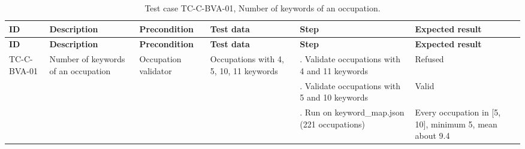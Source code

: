 {\footnotesize{}\renewcommand{\arraystretch}{1.1}
\begin{longtable}{|>{\raggedright\arraybackslash}p{}|>{\raggedright\arraybackslash}p{}|>{\raggedright\arraybackslash}p{}|>{\raggedright\arraybackslash}p{}|>{\raggedright\arraybackslash}p{}|>{\raggedright\arraybackslash}p{}|}
\caption{Test case TC-\allowbreak{}C-\allowbreak{}BVA-\allowbreak{}01, Number of keywords of an occupation.} \\
\hline
\textbf{ID} & \textbf{Description} & \textbf{Precondition} & \textbf{Test data} & \textbf{Step} & \textbf{Expected result} \\ \hline
\endfirsthead
\hline
\textbf{ID} & \textbf{Description} & \textbf{Precondition} & \textbf{Test data} & \textbf{Step} & \textbf{Expected result} \\ \hline
\endhead
TC-C-BVA-01 & Number of keywords of an occupation & Occupation validator & Occupations with 4, 5, 10, 11 keywords & 1. Validate occupations with 4 and 11 keywords & Refused \\ \cline{5-6}
 &  &  &  & 2. Validate occupations with 5 and 10 keywords & Valid \\ \cline{5-6}
 &  &  &  & 3. Run on keyword\_\allowbreak{}map.\allowbreak{}json (221 occupations) & Every occupation in [5, 10], minimum 5, mean about 9.4 \\ \hline
\end{longtable}
}

